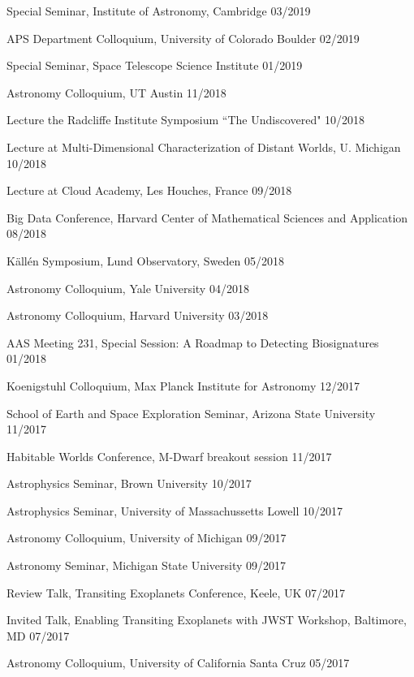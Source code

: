 \documentclass[12pt,letterpaper]{article}
\begin{document}
\begin{list}{}{\cvlist}
\item {Special Seminar, Institute of Astronomy, Cambridge \hfill 03/2019}
\item {APS Department Colloquium, University of Colorado Boulder \hfill 02/2019}
\item {Special Seminar, Space Telescope Science Institute \hfill 01/2019}
\item {Astronomy Colloquium, UT Austin \hfill 11/2018}
\item {Lecture the Radcliffe Institute Symposium ``The Undiscovered" \hfill 10/2018}
\item {Lecture at Multi-Dimensional Characterization of Distant Worlds, U. Michigan \hfill 10/2018}
\item {Lecture at Cloud Academy, Les Houches, France \hfill 09/2018} 
\item {Big Data Conference, Harvard Center of Mathematical Sciences and Application \hfill 08/2018}
\item {K\"{a}ll\'{e}n Symposium, Lund Observatory, Sweden \hfill 05/2018}
\item {Astronomy Colloquium, Yale University \hfill 04/2018}
\item{Astronomy Colloquium, Harvard University \hfill 03/2018}
\item {AAS Meeting 231, Special Session: A Roadmap to Detecting Biosignatures \hfill 01/2018}
\item {Koenigstuhl Colloquium, Max Planck Institute for Astronomy \hfill 12/2017}
\item {School of Earth and Space Exploration Seminar, Arizona State University \hfill 11/2017}
\item {Habitable Worlds Conference, M-Dwarf breakout session \hfill 11/2017}
\item {Astrophysics Seminar, Brown University \hfill 10/2017}
\item {Astrophysics Seminar, University of Massachussetts Lowell \hfill 10/2017}
\item {Astronomy Colloquium, University of Michigan \hfill 09/2017}
\item {Astronomy Seminar, Michigan State University \hfill 09/2017}
\item {Review Talk, Transiting Exoplanets Conference, Keele, UK \hfill 07/2017}
\item {Invited Talk, Enabling Transiting Exoplanets with JWST Workshop, Baltimore, MD \hfill 07/2017}
\item {Astronomy Colloquium, University of California Santa Cruz \hfill 05/2017}

\end{list}
\end{document}
